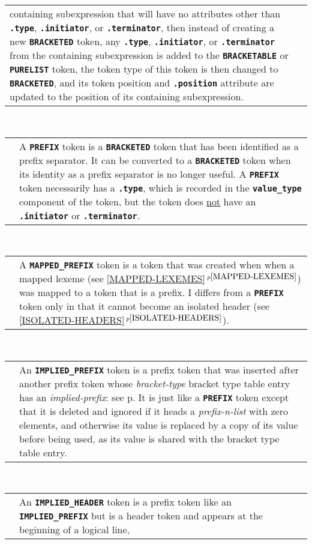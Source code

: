 \documentclass[12pt]{article}
\newcommand{\TT}[1]{{\tt \bfseries #1}}
\newcommand{\itemref}[1]{\ref{#1}$\,^{p\pageref{#1}}$}
\newcommand{\pagref}[1]{p\pageref{#1}}
\newcommand{\EOL}{\penalty \exhyphenpenalty}
\newenvironment{indpar}[1][0.3in]%
	{\begin{list}{}%
		     {\setlength{\itemsep}{0in}%
		      \setlength{\topsep}{0in}%
		      \setlength{\parsep}{1ex}%
		      \setlength{\labelwidth}{#1}%
		      \setlength{\leftmargin}{#1}%
		      \addtolength{\leftmargin}{\labelsep}}%
	 \item}%
	{\end{list}}
\begin{document}
\begin{indpar}
\begin{tabular}{p{1in}p{4.5in}}
		  containing subexpression that will have no attributes other
		  than \TT{.type}, \TT{.initiator}, or \TT{.terminator}, 
		  then instead of creating a new
		  \TT{BRACKETED} token, any \TT{.type}, \TT{.initiator},
		  or \TT{.terminator} from the containing subexpression
		  is added to the \TT{BRACKETABLE} or \TT{PURELIST} token,
		  the token type of this token is then
		  changed to \TT{BRACKETED}, and
		  its token position and \TT{.position} attribute are
		  updated to the position of its containing subexpression.
\end{tabular}
\\[1ex]
\begin{tabular}{p{1in}p{4.5in}}
		& A \TT{PREFIX} token is a
		  \TT{BRACKETED} token that has
		  been identified as a prefix separator.  It can be
		  converted to a \TT{BRACKETED} token when its identity
		  as a prefix separator is no longer useful.
		  A \TT{PREFIX} token necessarily has a \TT{.type},
		  which is recorded in
		  the \TT{value\_type} component of the token,
		  but the token does \underline{not} have an \TT{.initiator}
		  or \TT{.terminator}.
\end{tabular}
\\[1ex]
\begin{tabular}{p{1in}p{4.5in}}
		& A \TT{MAPPED\_PREFIX} token is a
		  token that was created when when a mapped lexeme
		  (see \itemref{MAPPED-LEXEMES})
		  was mapped to a token that is a prefix.  I differs
		  from a \TT{PREFIX} token only in that it cannot
		  become an isolated header (see \itemref{ISOLATED-HEADERS}).
\end{tabular}
\\[1ex]
\begin{tabular}{p{1in}p{4.5in}}
		& An \TT{IMPLIED\_PREFIX} token is a prefix token that
		  was inserted after another prefix token whose
		  {\em bracket-\EOL type} bracket type table entry has an
		  {\em implied-\EOL prefix}: see
		  \pagref{IMPLIED-PREFIX}.
		  It is just like
		  a \TT{PREFIX} token except that it is deleted and
		  ignored if it heads a {\em prefix-n-list} with zero
		  elements, and otherwise its value is replaced by a
		  copy of its value before being used, as its value is
		  shared with the bracket type table entry.
\end{tabular}
\\[1ex]
\begin{tabular}{p{1in}p{4.5in}}
		& An \TT{IMPLIED\_HEADER} token is a prefix token like an
		  \TT{IMPLIED\_\EOL PREFIX} but is a header token
		  and appears at the beginning of a logical line,

\end{tabular}
\end{indpar}
\end{document}

